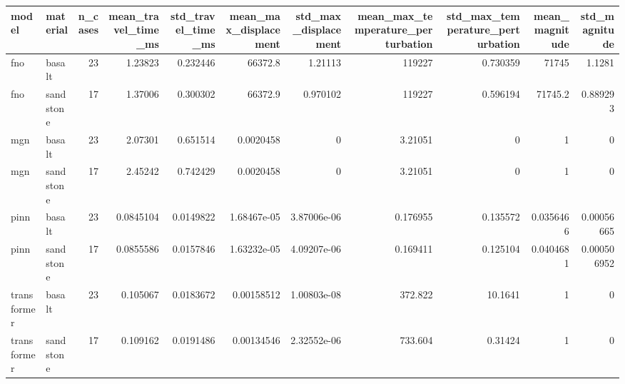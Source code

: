 \begin{tabular}{llrrrrrrrrr}
\toprule
model & material & n_cases & mean_travel_time_ms & std_travel_time_ms & mean_max_displacement & std_max_displacement & mean_max_temperature_perturbation & std_max_temperature_perturbation & mean_magnitude & std_magnitude \\
\midrule
fno & basalt & 23 & 1.23823 & 0.232446 & 66372.8 & 1.21113 & 119227 & 0.730359 & 71745 & 1.1281 \\
fno & sandstone & 17 & 1.37006 & 0.300302 & 66372.9 & 0.970102 & 119227 & 0.596194 & 71745.2 & 0.889293 \\
mgn & basalt & 23 & 2.07301 & 0.651514 & 0.0020458 & 0 & 3.21051 & 0 & 1 & 0 \\
mgn & sandstone & 17 & 2.45242 & 0.742429 & 0.0020458 & 0 & 3.21051 & 0 & 1 & 0 \\
pinn & basalt & 23 & 0.0845104 & 0.0149822 & 1.68467e-05 & 3.87006e-06 & 0.176955 & 0.135572 & 0.0356466 & 0.00056665 \\
pinn & sandstone & 17 & 0.0855586 & 0.0157846 & 1.63232e-05 & 4.09207e-06 & 0.169411 & 0.125104 & 0.0404681 & 0.000506952 \\
transformer & basalt & 23 & 0.105067 & 0.0183672 & 0.00158512 & 1.00803e-08 & 372.822 & 10.1641 & 1 & 0 \\
transformer & sandstone & 17 & 0.109162 & 0.0191486 & 0.00134546 & 2.32552e-06 & 733.604 & 0.31424 & 1 & 0 \\
\bottomrule
\end{tabular}
